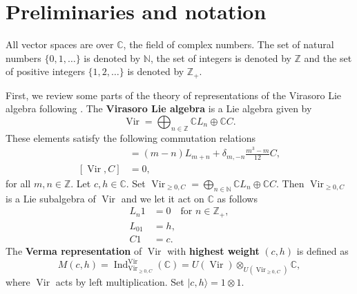 \documentclass[12pt, reqno]{amsart}
\theoremstyle{remark}
\DeclareMathOperator{\Vir}{Vir}
\DeclareMathOperator{\Ind}{Ind}
\begin{document}
\section{Preliminaries and notation}
\label{sec:prel-notat}
All vector spaces are over $\mathbb{C}$, the field of complex numbers.
The set of natural numbers $\{0, 1, \dots\}$ is denoted by $\mathbb{N}$, the set of integers is denoted by $\mathbb{Z}$ and the set of positive integers $\{1, 2, \dots\}$ is denoted by $\mathbb{Z}_+$.

First, we review some parts of the theory of representations of the Virasoro Lie algebra following \cite{kac_bombay_2013}.
The \textbf{Virasoro Lie algebra} is a Lie algebra given by
\begin{equation*}
  \Vir = \bigoplus_{n \in \mathbb{Z}}\mathbb{C}L_n \oplus \mathbb{C}C.
\end{equation*}
These elements satisfy the following commutation relations
\begin{align*}
  [L_m, L_n] &= (m - n)L_{m + n} + \delta_{m, -n}\frac{m^3 - m}{12}C, \\
  [\Vir, C] &= 0, 
\end{align*}
for all $m, n \in \mathbb{Z}$.
Let $c, h \in \mathbb{C}$.
Set $\Vir_{\ge 0, C} = \bigoplus_{n \in \mathbb{N}}\mathbb{C}L_n \oplus \mathbb{C}C$.
Then $\Vir_{\ge 0, C}$ is a Lie subalgebra of $\Vir$ and we let it act on $\mathbb{C}$ as follows
\begin{align*}
  L_n1 &= 0 \quad \text{for }n \in \mathbb{Z}_+, \\
  L_01 &= h, \\
  C1 &= c.
\end{align*}
The \textbf{Verma representation} of $\Vir$ with \textbf{highest weight} $(c, h)$ is defined as 
\begin{equation*}
  M(c, h) = \Ind^{\Vir}_{\Vir_{\ge 0, C}}(\mathbb{C}) = U(\Vir) \otimes_{U(\Vir_{\ge 0, C})} \mathbb{C},
\end{equation*}
where $\Vir$ acts by left multiplication.
Set $|c, h\rangle = 1 \otimes 1$.
\end{document}
